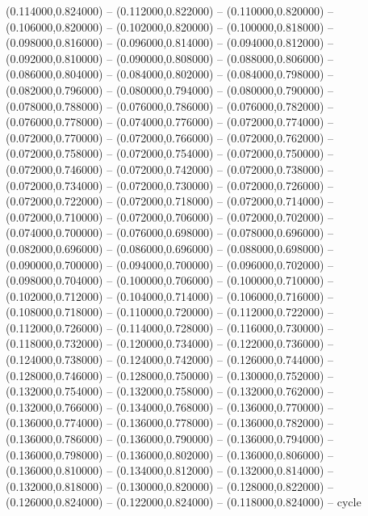    (0.114000,0.824000) -- (0.112000,0.822000) -- (0.110000,0.820000) -- (0.106000,0.820000) -- (0.102000,0.820000) -- (0.100000,0.818000) -- (0.098000,0.816000) -- (0.096000,0.814000) -- (0.094000,0.812000) -- (0.092000,0.810000) -- (0.090000,0.808000) -- (0.088000,0.806000) -- (0.086000,0.804000) -- (0.084000,0.802000) -- (0.084000,0.798000) -- (0.082000,0.796000) -- (0.080000,0.794000) -- (0.080000,0.790000) -- (0.078000,0.788000) -- (0.076000,0.786000) -- (0.076000,0.782000) -- (0.076000,0.778000) -- (0.074000,0.776000) -- (0.072000,0.774000) -- (0.072000,0.770000) -- (0.072000,0.766000) -- (0.072000,0.762000) -- (0.072000,0.758000) -- (0.072000,0.754000) -- (0.072000,0.750000) -- (0.072000,0.746000) -- (0.072000,0.742000) -- (0.072000,0.738000) -- (0.072000,0.734000) -- (0.072000,0.730000) -- (0.072000,0.726000) -- (0.072000,0.722000) -- (0.072000,0.718000) -- (0.072000,0.714000) -- (0.072000,0.710000) -- (0.072000,0.706000) -- (0.072000,0.702000) -- (0.074000,0.700000) -- (0.076000,0.698000) -- (0.078000,0.696000) -- (0.082000,0.696000) -- (0.086000,0.696000) -- (0.088000,0.698000) -- (0.090000,0.700000) -- (0.094000,0.700000) -- (0.096000,0.702000) -- (0.098000,0.704000) -- (0.100000,0.706000) -- (0.100000,0.710000) -- (0.102000,0.712000) -- (0.104000,0.714000) -- (0.106000,0.716000) -- (0.108000,0.718000) -- (0.110000,0.720000) -- (0.112000,0.722000) -- (0.112000,0.726000) -- (0.114000,0.728000) -- (0.116000,0.730000) -- (0.118000,0.732000) -- (0.120000,0.734000) -- (0.122000,0.736000) -- (0.124000,0.738000) -- (0.124000,0.742000) -- (0.126000,0.744000) -- (0.128000,0.746000) -- (0.128000,0.750000) -- (0.130000,0.752000) -- (0.132000,0.754000) -- (0.132000,0.758000) -- (0.132000,0.762000) -- (0.132000,0.766000) -- (0.134000,0.768000) -- (0.136000,0.770000) -- (0.136000,0.774000) -- (0.136000,0.778000) -- (0.136000,0.782000) -- (0.136000,0.786000) -- (0.136000,0.790000) -- (0.136000,0.794000) -- (0.136000,0.798000) -- (0.136000,0.802000) -- (0.136000,0.806000) -- (0.136000,0.810000) -- (0.134000,0.812000) -- (0.132000,0.814000) -- (0.132000,0.818000) -- (0.130000,0.820000) -- (0.128000,0.822000) -- (0.126000,0.824000) -- (0.122000,0.824000) -- (0.118000,0.824000) -- cycle
